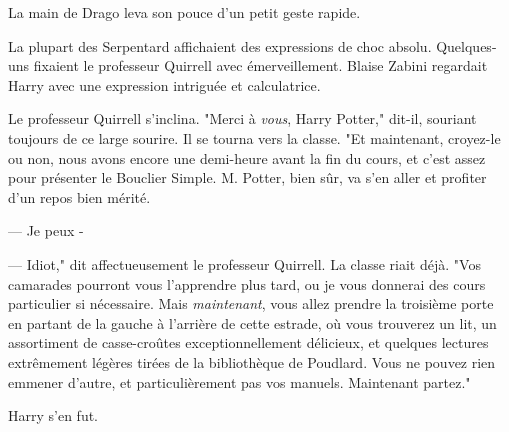 La main de Drago leva son pouce d'un petit geste rapide.

La plupart des Serpentard affichaient des expressions de choc absolu. Quelques-uns fixaient le professeur Quirrell avec émerveillement. Blaise Zabini regardait Harry avec une expression intriguée et calculatrice.

Le professeur Quirrell s'inclina. "Merci à \emph{vous}, Harry Potter," dit-il, souriant toujours de ce large sourire. Il se tourna vers la classe. "Et maintenant, croyez-le ou non, nous avons encore une demi-heure avant la fin du cours, et c'est assez pour présenter le Bouclier Simple. M. Potter, bien sûr, va s'en aller et profiter d'un repos bien mérité.

--- Je peux -

--- Idiot," dit affectueusement le professeur Quirrell. La classe riait déjà. "Vos camarades pourront vous l'apprendre plus tard, ou je vous donnerai des cours particulier si nécessaire. Mais \emph{maintenant}, vous allez prendre la troisième porte en partant de la gauche à l'arrière de cette estrade, où vous trouverez un lit, un assortiment de casse-croûtes exceptionnellement délicieux, et quelques lectures extrêmement légères tirées de la bibliothèque de Poudlard. Vous ne pouvez rien emmener d'autre, et particulièrement pas vos manuels. Maintenant partez."

Harry s'en fut. 

